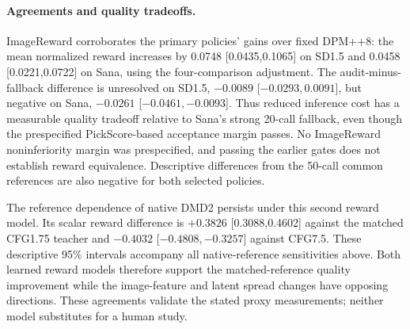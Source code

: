 \paragraph{Agreements and quality tradeoffs.}
ImageReward corroborates the primary policies' gains over fixed DPM++8:
the mean normalized reward increases by 0.0748 [0.0435,0.1065] on SD1.5
and 0.0458 [0.0221,0.0722] on Sana, using the four-comparison adjustment.
The audit-minus-fallback difference is unresolved on SD1.5,
$-0.0089$ [$-0.0293,0.0091$], but negative on Sana,
$-0.0261$ [$-0.0461,-0.0093$]. Thus reduced inference cost has a measurable
quality tradeoff relative to Sana's strong 20-call fallback, even though the
prespecified PickScore-based acceptance margin passes. No ImageReward
noninferiority margin was prespecified, and passing the earlier gates does
not establish reward equivalence. Descriptive differences from the 50-call
common references are also negative for both selected policies.

The reference dependence of native DMD2 persists under this second reward
model. Its scalar reward difference is $+0.3826$ [0.3088,0.4602] against
the matched CFG1.75 teacher and $-0.4032$ [$-0.4808,-0.3257$] against
CFG7.5. These descriptive 95\% intervals accompany all native-reference
sensitivities above. Both learned reward models therefore support the
matched-reference quality improvement while the image-feature and latent
spread changes have opposing directions. These agreements validate the
stated proxy measurements; neither model substitutes for a human study.
